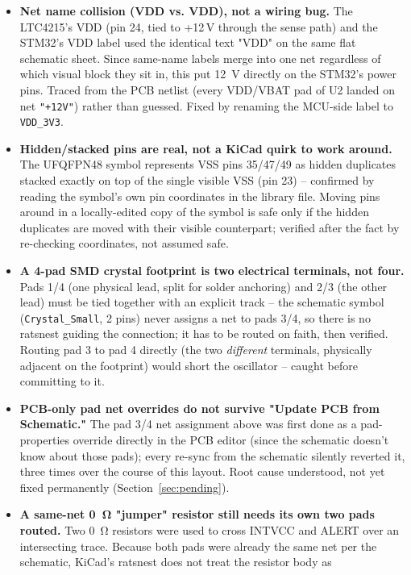 \documentclass[11pt]{article}
\begin{document}
\begin{itemize}
\item \textbf{Net name collision (VDD vs. VDD), not a wiring bug.} The LTC4215's VDD (pin 24, tied to
  +12\,V through the sense path) and the STM32's VDD label used the identical text "VDD" on the same
  flat schematic sheet. Since same-name labels merge into one net regardless of which visual block
  they sit in, this put \SI{12}{\volt} directly on the STM32's power pins. Traced from the PCB netlist
  (every VDD/VBAT pad of U2 landed on net \texttt{"+12V"}) rather than guessed. Fixed by renaming the
  MCU-side label to \texttt{VDD\_3V3}.
\item \textbf{Hidden/stacked pins are real, not a KiCad quirk to work around.} The UFQFPN48 symbol
  represents VSS pins 35/47/49 as hidden duplicates stacked exactly on top of the single visible VSS
  (pin 23) -- confirmed by reading the symbol's own pin coordinates in the library file. Moving pins
  around in a locally-edited copy of the symbol is safe only if the hidden duplicates are moved with
  their visible counterpart; verified after the fact by re-checking coordinates, not assumed safe.
\item \textbf{A 4-pad SMD crystal footprint is two electrical terminals, not four.} Pads 1/4 (one
  physical lead, split for solder anchoring) and 2/3 (the other lead) must be tied together with an
  explicit track -- the schematic symbol (\texttt{Crystal\_Small}, 2 pins) never assigns a net to
  pads 3/4, so there is no ratsnest guiding the connection; it has to be routed on faith, then
  verified. Routing pad 3 to pad 4 directly (the two \emph{different} terminals, physically adjacent
  on the footprint) would short the oscillator -- caught before committing to it.
\item \textbf{PCB-only pad net overrides do not survive "Update PCB from Schematic."} The pad 3/4 net
  assignment above was first done as a pad-properties override directly in the PCB editor (since the
  schematic doesn't know about those pads); every re-sync from the schematic silently reverted it,
  three times over the course of this layout. Root cause understood, not yet fixed permanently
  (Section~\ref{sec:pending}).
\item \textbf{A same-net \SI{0}{\ohm} "jumper" resistor still needs its own two pads routed.} Two \SI{0}{\ohm}
  resistors were used to cross INTVCC and ALERT over an intersecting trace. Because both pads were
  already the same net per the schematic, KiCad's ratsnest does not treat the resistor body as

\end{itemize}
\end{document}
